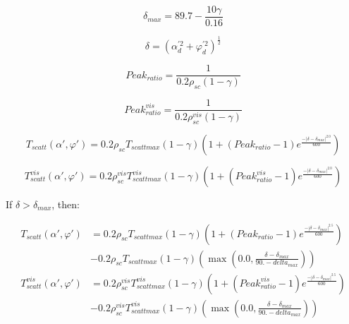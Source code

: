 \begin{equation}
{\delta_{max}} = 89.7 - {\frac{{10\gamma }}{0.16}}
\end{equation}

\begin{equation}
\delta  = {\left( {\alpha_d^{'2} + \varphi_d^{'2}} \right)^{\frac{1}{2}}}
\end{equation}

\begin{equation}
  Peak_{ratio} = \frac{1}{0.2{\rho_{sc}}\left( {1 - \gamma } \right)}
\end{equation}

\begin{equation}
  Peak_{ratio}^{vis} = \frac{1}{0.2\rho_{sc}^{vis}\left( {1 - \gamma } \right)}
\end{equation}

\begin{equation}
{T_{scatt}}\left( {\alpha ',\varphi '} \right) = 0.2{\rho_{sc}}{T_{scattmax}}\left( {1 - \gamma } \right)\left( {1 + \left( {Pea{k_{ratio}} - 1} \right){e^{\frac{{ - {{\left| {\delta  - {\delta_{max}}} \right|}^{2.0}}}}{{600}}}}} \right)
\end{equation}

\begin{equation}
T_{scatt}^{vis}\left( {\alpha ',\varphi '} \right) = 0.2\rho_{sc}^{vis}T_{scattmax}^{vis}\left( {1 - \gamma } \right)\left( {1 + \left( {Peak_{ratio}^{vis} - 1} \right){e^{\frac{{ - {{\left| {\delta  - {\delta_{max}}} \right|}^{2.0}}}}{{600}}}}} \right)
\end{equation}

If $\delta > \delta_{max}$, then:

\begin{equation}
  \begin{array}{rl}
    T_{scatt} \left( \alpha ',\varphi ' \right) &= 0.2 \rho_{sc} T_{scattmax} \left( 1 - \gamma \right) \left( 1 + \left( Peak_{ratio} - 1 \right) e^{\frac{- \left| \delta - \delta_{max} \right|^{2.5}}{600}} \right) \\
                                                &- 0.2 \rho_{sc} T_{scattmax} \left( 1 - \gamma \right) \left( \max \left( 0.0, \frac{\delta  - \delta_{max}}{90. - {delta_{max}}} \right) \right) \\
    T_{scatt}^{vis} \left( \alpha ',\varphi ' \right) &= 0.2 \rho_{sc}^{vis} T_{scattmax}^{vis} \left( 1 - \gamma \right) \left( 1 + \left( Peak_{ratio}^{vis} - 1 \right) e^{\frac{- \left| \delta - \delta_{max} \right|^{2.5}}{600}} \right) \\
                                                      &- 0.2 \rho_{sc}^{vis} T_{scattmax}^{vis} \left( 1 - \gamma \right) \left( \max \left( 0.0, \frac{\delta  - \delta_{max}}{90. - {delta_{max}}} \right) \right)
  \end{array}
\end{equation}


